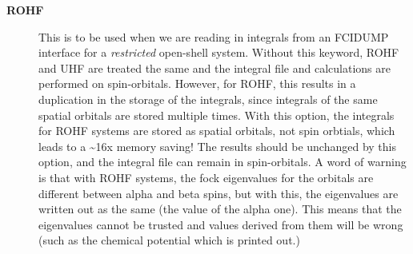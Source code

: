 \documentclass[openany,a4paper,10pt,english]{manual}
\begin{document}
\begin{description}
\item[\textbf{ROHF}] \leavevmode
This is to be used when we are reading in integrals from an FCIDUMP interface for a
\emph{restricted} open-shell system. Without this keyword, ROHF and UHF are treated the
same and the integral file and calculations are performed on spin-orbitals. However,
for ROHF, this results in a duplication in the storage of the integrals, since integrals
of the same spatial orbitals are stored multiple times. With this option, the integrals
for ROHF systems are stored as spatial orbitals, not spin orbtials, which leads to a
\textasciitilde{}16x memory saving! The results should be unchanged by this option, and the integral file
can remain in spin-orbitals. A word of warning is that with ROHF systems, the fock
eigenvalues for the orbitals are different between alpha and beta spins, but with this,
the eigenvalues are written out as the same (the value of the alpha one). This means that
the eigenvalues cannot be trusted and values derived from them will be wrong (such as the
chemical potential which is printed out.)

\end{description}
\end{document}
